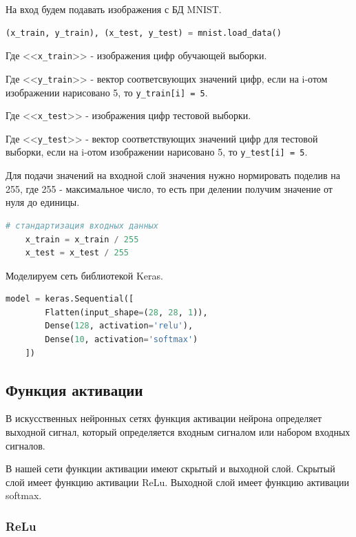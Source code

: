 На вход будем подавать изображения с БД MNIST.

\begin{lstlisting}[language=Python,]
    (x_train, y_train), (x_test, y_test) = mnist.load_data()
\end{lstlisting}

Где <<\verb|x_train|>> - изображения цифр обучающей выборки.

Где <<\verb|у_train|>> - вектор соответсвующих значений цифр,
если на i-отом изображении нарисовано 5, то \verb|y_train[i] = 5|.

Где <<\verb|x_test|>> - изображения цифр тестовой выборки.

Где <<\verb|у_test|>> - вектор соответствующих значений цифр для тестовой выборки,
если на i-отом изображении нарисовано 5, то \verb|y_test[i] = 5|.

Для подачи значений на входной слой значения нужно нормировать поделив на 255, где 255 - максимальное число, то есть при делении получим значение от нуля до единицы.

\begin{lstlisting}[language=Python,]
    # стандартизация входных данных
    x_train = x_train / 255
    x_test = x_test / 255
\end{lstlisting}

Моделируем сеть библиотекой Keras.

\begin{lstlisting}[language=Python,]
    model = keras.Sequential([
        Flatten(input_shape=(28, 28, 1)),
        Dense(128, activation='relu'),
        Dense(10, activation='softmax')
    ])
\end{lstlisting}

\newpage

\subsection{Функция активации}

В искусственных нейронных сетях функция активации нейрона определяет выходной сигнал,
который определяется входным сигналом или набором входных сигналов.

В нашей сети функции активации имеют скрытый и выходной слой.
Скрытый слой имеет функцию активации ReLu.
Выходной слой имеет функцию активации softmax.

\subsubsection{ReLu}


